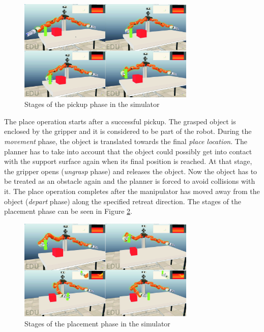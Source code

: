 \begin{figure}[h]
	\centering
  	\includegraphics[width=0.75\textwidth]{images/pickup.jpg}
	\caption{Stages of the pickup phase in the simulator}
	\label{fig:pickup}
\end{figure}

The place operation starts after a successful pickup. The grasped object is enclosed by the gripper and it is considered to be part of the robot. During the \emph{movement} phase, the object is translated towards the final \emph{place location}. The planner has to take into account that the object could possibly get into contact with the support surface again when its final position is reached. At that stage, the gripper opens (\emph{ungrasp} phase) and releases the object. Now the object has to be treated as an obstacle again and the planner is forced to avoid collisions with it. The place operation completes after the manipulator has moved away from the object (\emph{depart} phase) along the specified retreat direction. The stages of the placement phase can be seen in Figure \ref{fig:placement}.

\begin{figure}[h]
	\centering
  	\includegraphics[width=0.75\textwidth]{images/placement.jpg}
	\caption{Stages of the placement phase in the simulator}
	\label{fig:placement}
\end{figure}

